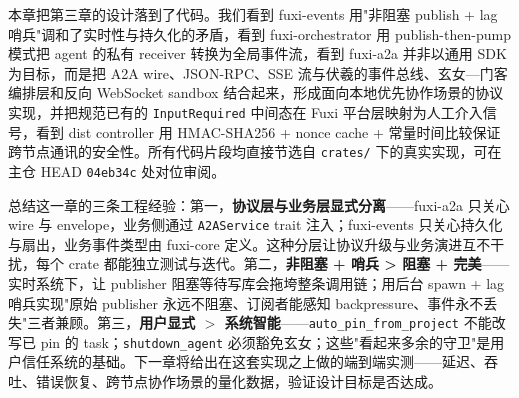本章把第三章的设计落到了代码。我们看到 fuxi-events 用"非阻塞 publish + lag 哨兵"调和了实时性与持久化的矛盾，看到 fuxi-orchestrator 用 publish-then-pump 模式把 agent 的私有 receiver 转换为全局事件流，看到 fuxi-a2a 并非以通用 SDK 为目标，而是把 A2A wire、JSON-RPC、SSE 流与伏羲的事件总线、玄女—门客编排层和反向 WebSocket sandbox 结合起来，形成面向本地优先协作场景的协议实现，并把规范已有的 \texttt{InputRequired} 中间态在 Fuxi 平台层映射为人工介入信号，看到 dist controller 用 HMAC-SHA256 + nonce cache + 常量时间比较保证跨节点通讯的安全性。所有代码片段均直接节选自 \texttt{crates/} 下的真实实现，可在主仓 HEAD \texttt{04eb34c} 处对位审阅。

总结这一章的三条工程经验：第一，\textbf{协议层与业务层显式分离}——fuxi-a2a 只关心 wire 与 envelope，业务侧通过 \texttt{A2AService} trait 注入；fuxi-events 只关心持久化与扇出，业务事件类型由 fuxi-core 定义。这种分层让协议升级与业务演进互不干扰，每个 crate 都能独立测试与迭代。第二，\textbf{非阻塞 + 哨兵 > 阻塞 + 完美}——实时系统下，让 publisher 阻塞等待写库会拖垮整条调用链；用后台 spawn + lag 哨兵实现"原始 publisher 永远不阻塞、订阅者能感知 backpressure、事件永不丢失"三者兼顾。第三，\textbf{用户显式 \(>\) 系统智能}——\texttt{auto\_pin\_from\_project} 不能改写已 pin 的 task；\texttt{shutdown\_agent} 必须豁免玄女；这些"看起来多余的守卫"是用户信任系统的基础。下一章将给出在这套实现之上做的端到端实测——延迟、吞吐、错误恢复、跨节点协作场景的量化数据，验证设计目标是否达成。
